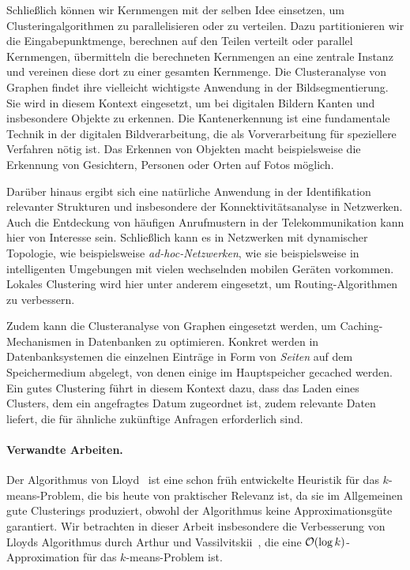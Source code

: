 Schließlich können wir Kernmengen mit der selben Idee einsetzen, um Clusteringalgorithmen zu parallelisieren oder zu verteilen.
Dazu partitionieren wir die Eingabepunktmenge, berechnen auf den Teilen verteilt oder parallel Kernmengen, übermitteln die
berechneten Kernmengen an eine zentrale Instanz und vereinen diese dort zu einer gesamten Kernmenge.
\absatz
Die Clusteranalyse von Graphen findet ihre vielleicht wichtigste Anwendung in der Bildsegmentierung. Sie wird in diesem
Kontext eingesetzt, um bei digitalen Bildern Kanten und insbesondere Objekte zu erkennen. Die Kantenerkennung ist eine
fundamentale Technik in der digitalen Bildverarbeitung, die als Vorverarbeitung für speziellere Verfahren nötig ist. Das Erkennen
von Objekten macht beispielsweise die Erkennung von Gesichtern, Personen oder Orten auf Fotos möglich.

Darüber hinaus ergibt sich eine natürliche Anwendung in der Identifikation relevanter Strukturen und insbesondere der
Konnektivitätsanalyse in Netzwerken. Auch die Entdeckung von häufigen Anrufmustern in der Telekommunikation kann hier
von Interesse sein. Schließlich kann es in Netzwerken mit dynamischer Topologie, wie beispielsweise \emph{ad-hoc-Netzwerken},
wie sie beispielsweise in intelligenten Umgebungen mit vielen wechselnden mobilen Geräten vorkommen. Lokales Clustering
wird hier unter anderem eingesetzt, um Routing-Algorithmen zu verbessern.

Zudem kann die Clusteranalyse von Graphen eingesetzt werden, um Caching-Mechanismen in Datenbanken zu optimieren.
Konkret werden in Datenbanksystemen die einzelnen Einträge in Form von \emph{Seiten} auf dem Speichermedium abgelegt,
von denen einige im Hauptspeicher gecached werden. Ein gutes Clustering führt in diesem Kontext dazu, dass das Laden eines
Clusters, dem ein angefragtes Datum zugeordnet ist, zudem relevante Daten liefert, die für ähnliche zukünftige Anfragen
erforderlich sind.

\paragraph{Verwandte Arbeiten.} Der Algorithmus von Lloyd~\cite{Lloyd82} ist eine schon früh entwickelte Heuristik für das
$k$-means-Problem, die bis heute von praktischer Relevanz ist, da sie im Allgemeinen gute Clusterings produziert, obwohl
der Algorithmus keine Approximationsgüte garantiert. Wir betrachten in dieser Arbeit insbesondere die Verbesserung von
Lloyds Algorithmus durch Arthur und Vassilvitskii~\citep{ArthurV07}, die eine $\mathcal{O}(\log k)$-Approximation für das
$k$-means-Problem ist.

